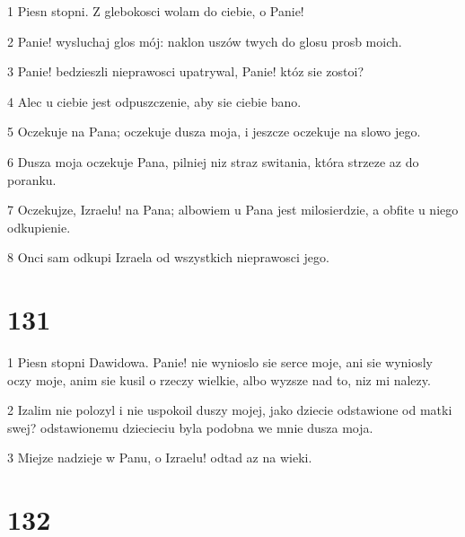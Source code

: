 \par 1 Piesn stopni. Z glebokosci wolam do ciebie, o Panie!
\par 2 Panie! wysluchaj glos mój: naklon uszów twych do glosu prosb moich.
\par 3 Panie! bedzieszli nieprawosci upatrywal, Panie! któz sie zostoi?
\par 4 Alec u ciebie jest odpuszczenie, aby sie ciebie bano.
\par 5 Oczekuje na Pana; oczekuje dusza moja, i jeszcze oczekuje na slowo jego.
\par 6 Dusza moja oczekuje Pana, pilniej niz straz switania, która strzeze az do poranku.
\par 7 Oczekujze, Izraelu! na Pana; albowiem u Pana jest milosierdzie, a obfite u niego odkupienie.
\par 8 Onci sam odkupi Izraela od wszystkich nieprawosci jego.

\chapter{131}

\par 1 Piesn stopni Dawidowa. Panie! nie wynioslo sie serce moje, ani sie wyniosly oczy moje, anim sie kusil o rzeczy wielkie, albo wyzsze nad to, niz mi nalezy.
\par 2 Izalim nie polozyl i nie uspokoil duszy mojej, jako dziecie odstawione od matki swej? odstawionemu dziecieciu byla podobna we mnie dusza moja.
\par 3 Miejze nadzieje w Panu, o Izraelu! odtad az na wieki.

\chapter{132}

